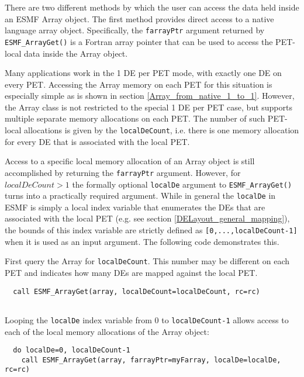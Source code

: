    There are two different methods by which the user can access the data held 
   inside an ESMF Array object. The first method provides direct access to a
   native language array object. Specifically, the {\tt farrayPtr} argument
   returned by {\tt ESMF\_ArrayGet()} is a Fortran array pointer that can be
   used to access the PET-local data inside the Array object.
  
   Many applications work in the 1 DE per PET mode, with exactly one DE on 
   every PET. Accessing the Array memory on each PET for this situation is 
   especially simple as is shown in section \ref{Array_from_native_1_to_1}.
   However, the Array class is not restricted to the special 1 DE per PET case,
   but supports multiple separate memory allocations on each PET.
   The number of such PET-local allocations is given by the {\tt localDeCount},
   i.e. there is one memory allocation for every DE that is associated with the
   local PET.
  
   Access to a specific local memory allocation of an Array object is still
   accomplished by returning the {\tt farrayPtr} argument. However, for
   $ localDeCount > 1 $ the formally optional {\tt localDe} argument to
   {\tt ESMF\_ArrayGet()} turns into a practically required argument. While
   in general the {\tt localDe} in ESMF is simply a local index variable that 
   enumerates the DEs that are associated with the local PET (e.g. see section
   \ref{DELayout_general_mapping}), the bounds of this index variable are 
   strictly defined as {\tt [0,...,localDeCount-1]} when it is used as an 
   input argument. The following code demonstrates this.
  
   First query the Array for {\tt localDeCount}. This number may be different
   on each PET and indicates how many DEs are mapped against the local PET. 

 \begin{verbatim}
  call ESMF_ArrayGet(array, localDeCount=localDeCount, rc=rc)
 
\end{verbatim}
 

   Looping the {\tt localDe} index variable from 0 to {\tt localDeCount-1} allows
   access to each of the local memory allocations of the Array object: 

 \begin{verbatim}
  do localDe=0, localDeCount-1
    call ESMF_ArrayGet(array, farrayPtr=myFarray, localDe=localDe, rc=rc)
 
\end{verbatim}
 
